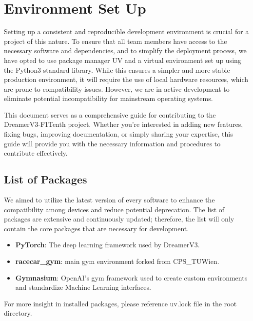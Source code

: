 \chapter{Environment Set Up}

Setting up a consistent and reproducible development environment is crucial for a project of this nature.  To ensure that all team members have access to the necessary software and dependencies, and to simplify the deployment process, we have opted to use package manager UV and a virtual environment set up using the Python3 standard library. While this ensures a simpler and more stable production environment, it will require the use of local hardware resources, which are prone to compatibility issues. However, we are in active development to eliminate potential incompatibility for mainstream operating systems.

This document serves as a comprehensive guide for contributing to the DreamerV3-F1Tenth project. Whether you're interested in adding new features, fixing bugs, improving documentation, or simply sharing your expertise, this guide will provide you with the necessary information and procedures to contribute effectively.

\section{List of Packages}
We aimed to utilize the latest version of every software to enhance the compatibility among devices and reduce potential deprecation. The list of packages are extensive and continuously updated; therefore, the list will only contain the core packages that are necessary for development.
\begin{itemize}
    \item \textbf{PyTorch}: The deep learning framework used by DreamerV3.
    \item \textbf{racecar\_gym}: main gym environment forked from CPS\_TUWien.
    \item \textbf{Gymnasium}: OpenAI's gym framework used to create custom environments and standardize Machine Learning interfaces.
\end{itemize}
For more insight in installed packages, please reference uv.lock file in the root directory.

